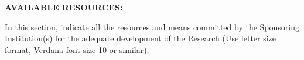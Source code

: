 \documentclass[demo, MAIN.tex]{subfiles}
\begin{document}
\noindent\textbf{AVAILABLE RESOURCES:}

\bigskip

\noindent In this section, indicate all the resources and means
committed by the Sponsoring Institution(s) for the adequate
development of the Research (Use letter size format, Verdana font size
10 or similar).

\bigskip
\end{document}
